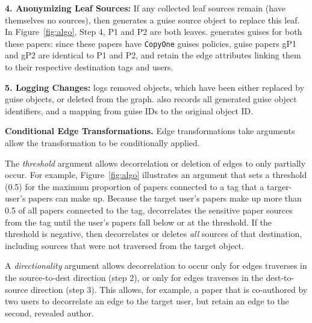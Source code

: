            \vspace{0.5\baselineskip}\noindent\textbf{4. Anonymizing Leaf Sources:}
        If any collected leaf sources remain (have themselves no sources), then \sys generates a
        guise source object to replace this leaf.
        In Figure~\ref{fig:algo}, Step 4, P1 and P2 are both leaves. \sys generates guises for both
        these papers: since these papers have \texttt{CopyOne} guises policies, guise papers gP1 and
        gP2 are identical to P1 and P2, and retain the edge attributes linking them to their
        respective destination tags and users.

    \vspace{0.5\baselineskip}\noindent\textbf{5. Logging Changes:} 
    \sys logs removed objects, which have been either replaced by guise objects, or deleted
    from the graph. \sys also records all generated guise object identifiers, and a mapping from
    guise IDs to the original object ID. 

    \vspace{0.5\baselineskip}\noindent\textbf{Conditional Edge Transformations.}
        Edge transformations take arguments allow the transformation to be conditionally applied.

        The \emph{threshold} argument allows decorrelation or deletion of edges to only partially
        occur. 
        For example, Figure~\ref{fig:algo} illustrates an argument that sets a threshold (0.5) for the
        maximum proportion of papers connected to a tag that a targer-user's papers can make up.
        Because the target user's papers make up more than 0.5 of all papers connected to the tag,
        \sys decorrelates the sensitive paper sources from the tag until the user's papers fall
        below or at the threshold.
        If the threshold is negative, then \sys decorrelates or deletes \emph{all} sources of that
        destination, including sources that were not traversed from the target object.

        A \emph{directionality} argument allows decorrelation to occur only for edges \sys traverses
        in the source-to-dest direction (step 2), or only for edges \sys traverses in the dest-to-source
        direction (step 3). This allows, for example, a paper that is co-authored by two users to
        decorrelate an edge to the target user, but retain an edge to the second, revealed author.


